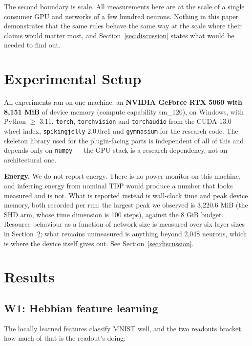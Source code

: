 \documentclass[11pt]{article}
\begin{document}
The second boundary is scale. All measurements here are at the scale of a single
consumer GPU and networks of a few hundred neurons. Nothing in this paper
demonstrates that the same rules behave the same way at the scale where their
claims would matter most, and Section~\ref{sec:discussion} states what would be
needed to find out.

\section{Experimental Setup}
\label{sec:setup}
All experiments ran on one machine: an \textbf{NVIDIA GeForce RTX 5060 with
8{,}151 MiB} of device memory (compute capability sm\_120), on Windows, with
Python $\geq$ 3.11, \texttt{torch}, \texttt{torchvision} and \texttt{torchaudio}
from the CUDA 13.0 wheel index, \texttt{spikingjelly} 2.0.0rc1 and
\texttt{gymnasium} for the research code. The skeleton library used for the
plugin-facing parts is independent of all of this and depends only on
\texttt{numpy} --- the GPU stack is a research dependency, not an architectural one.

\textbf{Energy.} We do not report energy. There is no power monitor on this
machine, and inferring energy from nominal TDP would produce a number that looks
measured and is not. What is reported instead is wall-clock time and peak device
memory, both recorded per run: the largest peak we observed is 3{,}220.6 MiB
(the SHD arm, whose time dimension is 100 steps), against the 8 GiB budget.
Resource behaviour as a function of network size is measured over six layer sizes
in Section~\ref{sec:results}; what remains unmeasured is anything beyond 2{,}048
neurons, which is where the device itself gives out. See Section~\ref{sec:discussion}.

\section{Results}
\label{sec:results}
\subsection{W1: Hebbian feature learning}
The locally learned features classify MNIST well, and the two readouts bracket
how much of that is the readout's doing:
\end{document}
